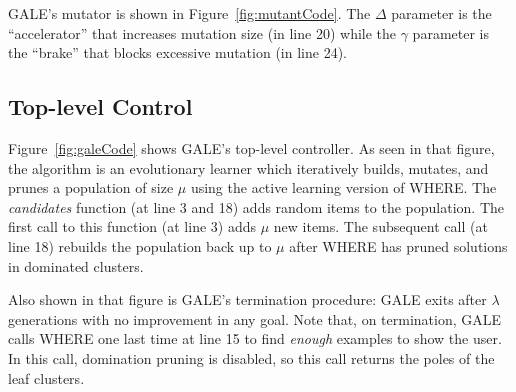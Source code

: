 \documentclass[10pt,journal,compsoc]{IEEEtran}
\newcommand{\fig}[1]{Figure~\ref{fig:#1}}
\begin{document}
GALE's mutator is shown in \fig{mutantCode}.
The $\Delta$ parameter is the ``accelerator'' that increases mutation size (in line 20) while the  $\gamma$ parameter is the ``brake'' that blocks excessive mutation (in line 24).

 

\subsection{Top-level Control}

\fig{galeCode} shows GALE's top-level controller.  
As seen in that figure, the algorithm  is an evolutionary learner which iteratively builds, mutates, and prunes a population of size $\mu$ using the active learning version of WHERE.
The {\em candidates} function (at line 3 and 18) adds random items to the population. 
The first call to this function (at line 3) adds $\mu$ new items. The subsequent call (at line 18) rebuilds the population back up to $\mu$ after WHERE has pruned solutions in dominated clusters.

Also shown in that figure is GALE's termination procedure: GALE exits after $\lambda$ generations with no improvement in any goal.
Note that, on termination, GALE calls WHERE one last time at line 15 to find {\em enough} examples to show the user. 
In this call, domination pruning is disabled, so this call returns the poles of the leaf clusters.
\end{document}
